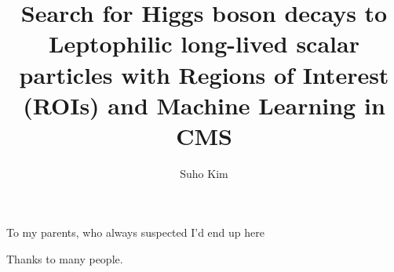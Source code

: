 \documentclass[11pt,expanded,copyright]{fsuthesis}
\title{Search for Higgs boson decays to Leptophilic long-lived scalar particles with Regions of Interest (ROIs) and Machine Learning in CMS}
\author{Suho Kim}  %
\begin{document}
\frontmatter          %
\maketitle            %
\makecommitteepage    %

\begin{dedication}
\centering
To my parents, who always suspected I'd end up here
\end{dedication}

\begin{acknowledgments}
Thanks to many people.
\end{acknowledgments}

\tableofcontents
\listoftables
\listoffigures


\end{document}
